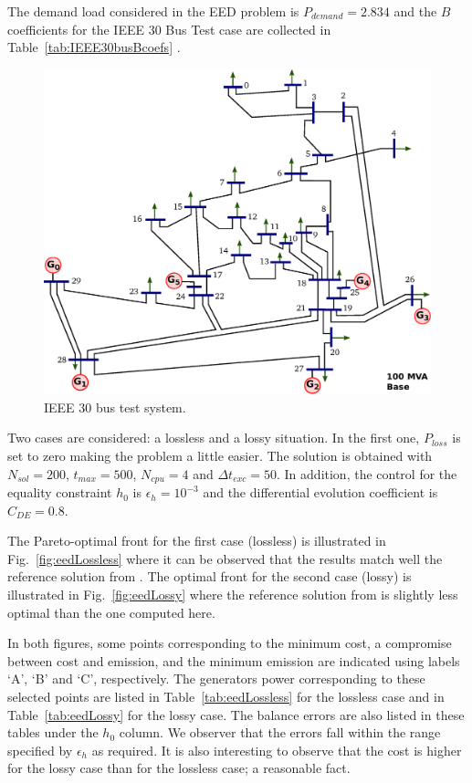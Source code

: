\documentclass[final,5p,times,twocolumn]{elsarticle}
\newcommand{\figname} {Fig.}
\begin{document}
The demand load considered in the EED problem is $P_{demand}=2.834$ and the $B$ coefficients for the
IEEE 30 Bus Test case are collected in Table~\ref{tab:IEEE30busBcoefs} \citep{wang:08, ozyon:12,
pal:12}.

\begin{figure} \centering
\includegraphics[width=\linewidth]{./figs/IEEE30bus.eps}
\caption{IEEE 30 bus test system.}
\label{fig:IEEE30bus}
\end{figure}

\IEEEthirtyBusPrms

\IEEEthirtyBusBcoefs

Two cases are considered: a lossless and a lossy situation. In the first one, $P_{loss}$ is set to
zero making the problem a little easier. The solution is obtained with ${N_{sol}=200}$,
${t_{max}=500}$, ${N_{cpu}=4}$ and ${\Delta t_{exc}=50}$. In addition, the control for the equality
constraint $h_0$ is ${\epsilon_h=10^{-3}}$ and the differential evolution coefficient is
$C_{DE}=0.8$.

The Pareto-optimal front for the first case (lossless) is illustrated in
\figname~\ref{fig:eedLossless} where it can be observed that the results match well the reference
solution from \citep{abido:06}. The optimal front for the second case (lossy) is illustrated in
\figname~\ref{fig:eedLossy} where the reference solution from \citep{abido:06} is slightly less
optimal than the one computed here.

In both figures, some points corresponding to the minimum cost, a compromise between cost and
emission, and the minimum emission are indicated using labels `A', `B' and `C', respectively. The
generators power corresponding to these selected points are listed in Table~\ref{tab:eedLossless}
for the lossless case and in Table~\ref{tab:eedLossy} for the lossy case. The balance errors are
also listed in these tables under the $h_0$ column. We observer that the errors fall within the
range specified by $\epsilon_h$ as required. It is also interesting to observe that the cost is
higher for the lossy case than for the lossless case; a reasonable fact.
\end{document}

